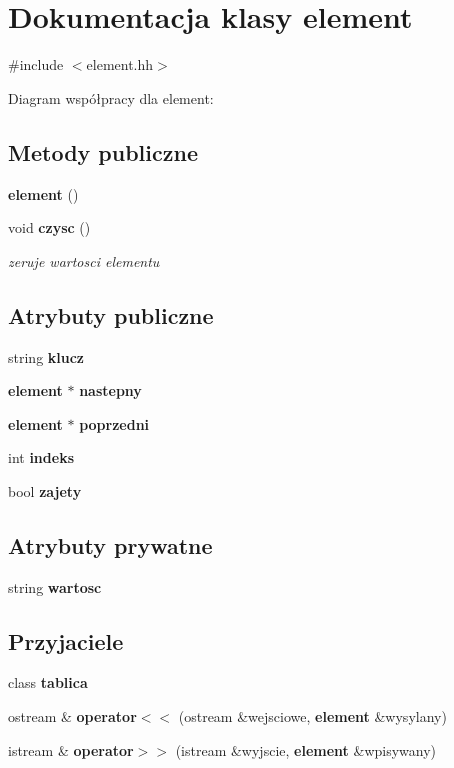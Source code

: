 \section{\-Dokumentacja klasy element}
\label{classelement}


{\ttfamily \#include $<$element.\-hh$>$}



\-Diagram współpracy dla element\-:
\subsection*{\-Metody publiczne}
\begin{DoxyCompactItemize}
\item 
{\bf element} ()
\item 
void {\bf czysc} ()
\begin{DoxyCompactList}\small\item\em zeruje wartosci elementu \end{DoxyCompactList}\end{DoxyCompactItemize}
\subsection*{\-Atrybuty publiczne}
\begin{DoxyCompactItemize}
\item 
string {\bf klucz}
\item 
{\bf element} $\ast$ {\bf nastepny}
\item 
{\bf element} $\ast$ {\bf poprzedni}
\item 
int {\bf indeks}
\item 
bool {\bf zajety}
\end{DoxyCompactItemize}
\subsection*{\-Atrybuty prywatne}
\begin{DoxyCompactItemize}
\item 
string {\bf wartosc}
\end{DoxyCompactItemize}
\subsection*{\-Przyjaciele}
\begin{DoxyCompactItemize}
\item 
class {\bf tablica}
\item 
ostream \& {\bf operator$<$$<$} (ostream \&wejsciowe, {\bf element} \&wysylany)
\item 
istream \& {\bf operator$>$$>$} (istream \&wyjscie, {\bf element} \&wpisywany)
\end{DoxyCompactItemize}


